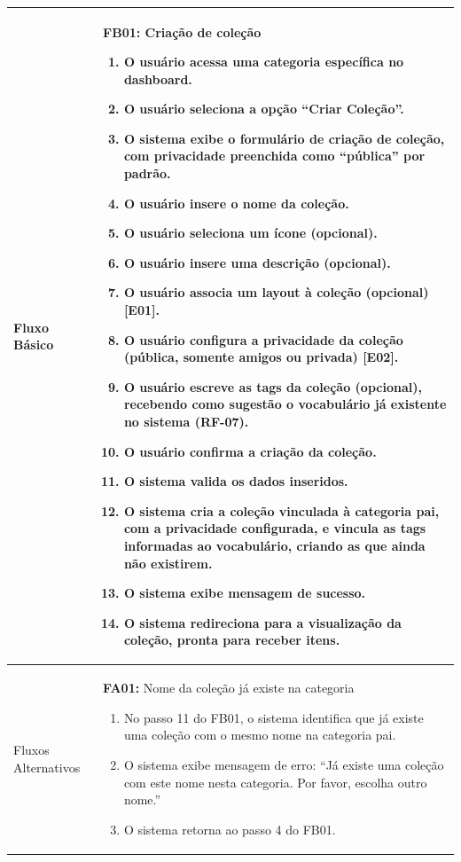 \begin{longtable}{ >{\raggedright}p{2.8cm} | >{\raggedright\arraybackslash}p{10.7cm} }
Fluxo Básico & \mbox{}
\textbf{FB01:} Criação de coleção
\vspace{2pt}
\begin{enumerate}[nosep,leftmargin=1.2em,topsep=0pt,partopsep=0pt,parsep=0pt,itemsep=0pt,after=\vspace{2pt}]
	\item O usuário acessa uma categoria específica no dashboard.
	\item O usuário seleciona a opção ``Criar Coleção''.
	\item O sistema exibe o formulário de criação de coleção, com privacidade preenchida como ``pública'' por padrão.
	\item O usuário insere o nome da coleção.
	\item O usuário seleciona um ícone (opcional).
	\item O usuário insere uma descrição (opcional).
	\item O usuário associa um layout à coleção (opcional) [E01].
	\item O usuário configura a privacidade da coleção (pública, somente amigos ou privada) [E02].
	\item O usuário escreve as tags da coleção (opcional), recebendo como sugestão o vocabulário já existente no sistema (RF-07).
	\item O usuário confirma a criação da coleção.
	\item O sistema valida os dados inseridos.
	\item O sistema cria a coleção vinculada à categoria pai, com a privacidade configurada, e vincula as tags informadas ao vocabulário, criando as que ainda não existirem.
	\item O sistema exibe mensagem de sucesso.
	\item O sistema redireciona para a visualização da coleção, pronta para receber itens.
\end{enumerate}
\mbox{} \\ \hline

Fluxos Alternativos & \mbox{}
\textbf{FA01:} Nome da coleção já existe na categoria
\vspace{2pt}
\begin{enumerate}[nosep,leftmargin=1.2em,topsep=0pt,partopsep=0pt,parsep=0pt,itemsep=0pt,after=\vspace{2pt}]
	\item No passo 11 do FB01, o sistema identifica que já existe uma coleção com o mesmo nome na categoria pai.
	\item O sistema exibe mensagem de erro: ``Já existe uma coleção com este nome nesta categoria. Por favor, escolha outro nome.''
	\item O sistema retorna ao passo 4 do FB01.
\end{enumerate}


\end{longtable}
